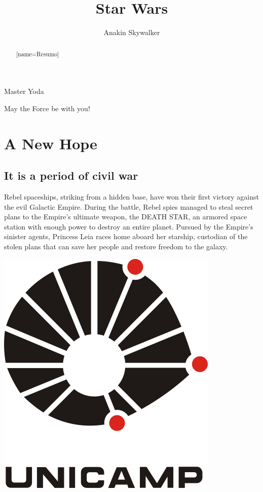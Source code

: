\documentclass[12pt,oneside]{ifgw}
\author{Anakin Skywalker}
\institute{Darth Plagueis Institute}
\title{Star Wars}
\begin{document}
\maketitle
{}

\dedication{To my son, Luke Skywalker}

\epigraph{Master Yoda}{May the Force be with you!}

\begin{abstract}[name=Resumo]
\lipsum[1]
\end{abstract}

\begin{abstract}
\lipsum[1]
\end{abstract}

\tableofcontents

\chapter{A New Hope}
\section{It is a period of civil war}

Rebel spaceships, striking from a hidden base, have won their first victory against the evil Galactic Empire.  During the battle, Rebel spies managed to steal secret plans to the Empire's ultimate weapon, the DEATH STAR, an armored space station with enough power to destroy an entire planet. Pursued by the Empire's sinister agents, Princess Leia races home aboard her starship, custodian of the stolen plans that can save her people and restore freedom to the galaxy.


\lipsum[1-3]


\begin{center}
\includegraphics[width=.35\textwidth]{Images/unicamp.png}
\end{center}
\end{document}
